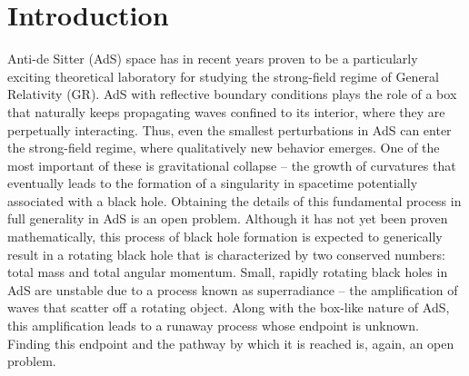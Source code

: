 \documentclass[a4paper,11pt]{article}
\numberwithin{equation}{section}
\begin{document}
\tableofcontents

%
% 

\hrulefill
\vspace{10pt}

\section{Introduction}

Anti-de Sitter (AdS) space has in recent years proven to be a particularly exciting theoretical laboratory for studying the strong-field regime of General Relativity (GR).
AdS with reflective boundary conditions plays the role of a box that naturally keeps propagating waves confined to its interior, where they are perpetually interacting.
Thus, even the smallest perturbations in AdS can enter the strong-field regime, where qualitatively new behavior emerges.
One of the most important of these is gravitational collapse -- the growth of curvatures that eventually leads to the formation of a singularity in spacetime potentially associated with a black hole.
Obtaining the details of this fundamental process in full generality in AdS is an open problem. 
Although it has not yet been proven mathematically, this process of black hole formation is expected to generically result in a rotating black hole that is characterized by two conserved numbers: total mass and total angular momentum.
Small, rapidly rotating black holes in AdS are unstable due to a process known as superradiance -- the amplification of waves that scatter off a rotating object.
Along with the box-like nature of AdS, this amplification leads to a runaway process whose endpoint is unknown.
Finding this endpoint and the pathway by which it is reached is, again, an open problem.
\end{document}
